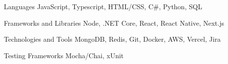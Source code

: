 

\begin{cvskills}

  \cvskill
    {Languages} %
    {JavaScript, Typescript, HTML/CSS, C\#, Python, SQL} %

  \cvskill
    {Frameworks and Libraries} %
    {Node, .NET Core, React, React Native, Next.js} %

  \cvskill
    {Technologies and Tools} %
    {MongoDB, Redis, Git, Docker, AWS, Vercel, Jira } %

  \cvskill
    {Testing Frameworks} %
    {Mocha/Chai, xUnit} %

\end{cvskills}
